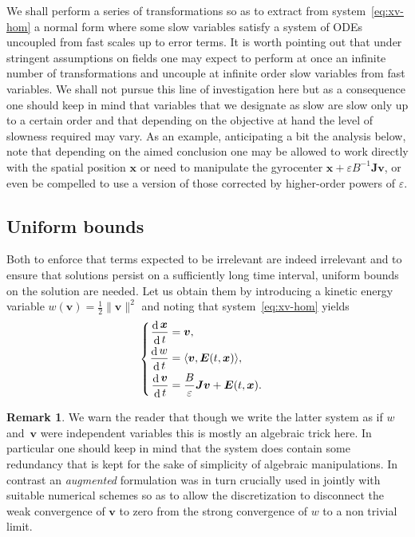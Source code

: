\documentclass[JEP,XML,SOM,Unicode]{cedram}
\newenvironment{splitcases}
{\begin{cases}\begin{aligned}}
{\end{aligned}\end{cases}}
\let\eps\varepsilon
\DeclareMathOperator\dD{d}\let\dd\dD
\theoremstyle{plain}
\theoremstyle{definition}
\newtheorem{remark}[theorem]{Remark}
\newcommand\br{\begin{remark}}
\newcommand\er{\end{remark}}
\newcommand\bE{{\boldsymbol E}}
\newcommand\bJ{{\boldsymbol J}}
\newcommand\bfv{{\boldsymbol v}}
\newcommand\bfx{{\boldsymbol x}}
\let\e w
\begin{document}
We shall perform a series of transformations so as to extract from system~\eqref{eq:xv-hom} a normal form where some slow variables satisfy a system of ODEs uncoupled from fast scales up to error terms. It is worth pointing out that under stringent assumptions on fields one may expect to perform at once an infinite number of transformations and uncouple at infinite order slow variables from fast variables. We shall not pursue this line of investigation here but as a consequence one should keep in mind that variables that we designate as slow are slow only up to a certain order and that depending on the objective at hand the level of slowness required may vary. As an example, anticipating a bit the analysis below, note that depending on the aimed conclusion one may be allowed to work directly with the spatial position $\bfx$ or need to manipulate the gyrocenter $\bfx+\eps B^{-1}\bJ\bfv$, or even be compelled to use a version of those corrected by higher-order powers of $\eps$.

\subsection{Uniform bounds}

Both to enforce that terms expected to be irrelevant are indeed
irrelevant and to ensure that solutions persist on a sufficiently long
time interval, uniform bounds on the solution are needed. Let us
obtain them by introducing a kinetic energy variable $\e(\bfv) =\tfrac12\|\bfv\|^2$ and noting that system~\eqref{eq:xv-hom} yields
\[
\begin{splitcases}
\frac{\dD\bfx}{\dD t}&=\bfv,
\\
\frac{\dD \e}{\dD t}&=
\langle\bfv,\bE(t,\bfx)\rangle,
\\
\frac{\dD\bfv}{\dD t}&=\frac{B}{\eps}\bJ\bfv+\bE(t,\bfx).
\end{splitcases}
\]

\br\label{rddnt-hom}
We warn the reader that though we write the latter system as if $\e$ and~$\bfv$ were independent variables this is mostly an algebraic trick here. In particular one should keep in mind that the system does contain some redundancy that is kept for the sake of simplicity of algebraic manipulations. In contrast an \emph{augmented} formulation was in turn crucially used in \cite{FR2} jointly with suitable numerical schemes so as to allow the discretization to disconnect the weak convergence of $\bfv$ to zero from the strong convergence of $\e$ to a non trivial limit.
\er
\end{document}
